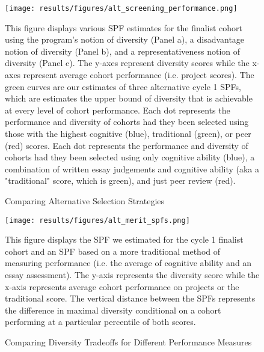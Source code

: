     \newpage
    \begin{figure}[!htb]
    \centering
        \caption{Comparing Alternative Selection Strategies} \label{fig:alt_screen}
      \texttt{[image: results/figures/alt\_screening\_performance.png]} 
        \begin{notes}
        This figure displays various SPF estimates for the  finalist cohort using the program's notion of diversity (Panel a), a disadvantage notion of diversity (Panel b), and a representativeness notion of diversity (Panel c). The y-axes represent diversity scores while the x-axes represent average cohort performance (i.e. project scores). The green curves are our estimates of three alternative cycle 1 SPFs, which are estimates the upper bound of diversity that is achievable at every level of cohort performance. Each dot represents the performance and diversity of cohorts had they been selected using those with the highest cognitive (blue), traditional (green), or peer (red) scores.  Each dot represents the performance and diversity of cohorts had they been selected using only cognitive ability (blue), a combination of written essay judgements and cognitive ability (aka a "traditional" score, which is green), and just peer review (red).
        \end{notes}
    \end{figure}
    
    \newpage
    \begin{figure}[!htb]
    \centering
        \caption{Comparing Diversity Tradeoffs for Different Performance Measures} \label{fig:compare_div_tradeoffs}
      \texttt{[image: results/figures/alt\_merit\_spfs.png]} 
        \begin{notes}
        This figure displays the SPF we estimated for the cycle 1 finalist cohort and an SPF based on a more traditional method of measuring performance (i.e. the average of cognitive ability and an essay assessment). The y-axis represents the diversity score while the x-axis represents average cohort performance on projects or the traditional score. The vertical distance between the SPFs represents the difference in maximal diversity conditional on a cohort performing at a particular percentile of both scores. 
        \end{notes}
    \end{figure}
    
    \newpage
    
